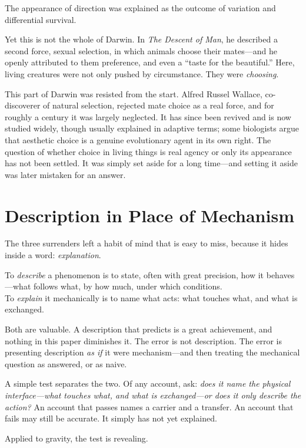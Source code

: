 \documentclass[11pt,a4paper]{article}
\begin{document}
The appearance of direction was explained as the outcome of variation and differential survival.

Yet this is not the whole of Darwin. In \emph{The Descent of Man}, he described a second force, sexual selection, in which animals choose their mates---and he openly attributed to them preference, and even a ``taste for the beautiful.'' Here, living creatures were not only pushed by circumstance. They were \emph{choosing}.

This part of Darwin was resisted from the start. Alfred Russel Wallace, co-discoverer of natural selection, rejected mate choice as a real force, and for roughly a century it was largely neglected. It has since been revived and is now studied widely, though usually explained in adaptive terms; some biologists argue that aesthetic choice is a genuine evolutionary agent in its own right. The question of whether choice in living things is real agency or only its appearance has not been settled. It was simply set aside for a long time---and setting it aside was later mistaken for an answer.

\section{Description in Place of Mechanism}

The three surrenders left a habit of mind that is easy to miss, because it hides inside a word: \emph{explanation}.

To \emph{describe} a phenomenon is to state, often with great precision, how it behaves---what follows what, by how much, under which conditions.\\
To \emph{explain} it mechanically is to name what acts: what touches what, and what is exchanged.

Both are valuable. A description that predicts is a great achievement, and nothing in this paper diminishes it. The error is not description. The error is presenting description \emph{as if} it were mechanism---and then treating the mechanical question as answered, or as naive.

A simple test separates the two. Of any account, ask: \emph{does it name the physical interface---what touches what, and what is exchanged---or does it only describe the action?} An account that passes names a carrier and a transfer. An account that fails may still be accurate. It simply has not yet explained.

Applied to gravity, the test is revealing.
\end{document}
